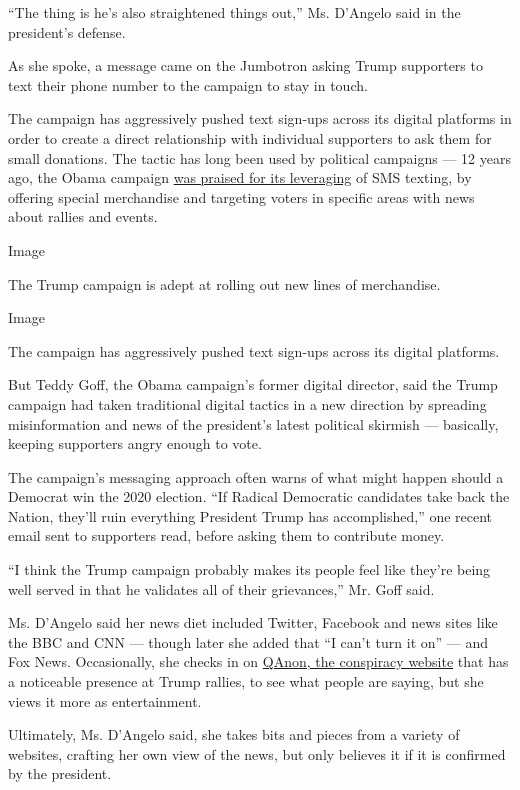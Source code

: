 ``The thing is he's also straightened things out,'' Ms. D'Angelo said in
the president's defense.

As she spoke, a message came on the Jumbotron asking Trump supporters to
text their phone number to the campaign to stay in touch.

The campaign has aggressively pushed text sign-ups across its digital
platforms in order to create a direct relationship with individual
supporters to ask them for small donations. The tactic has long been
used by political campaigns --- 12 years ago, the Obama campaign
\href{https://adage.com/article/btob/lessons-sms-marketing-obama-campaign/273955}{was
praised for its leveraging} of SMS texting, by offering special
merchandise and targeting voters in specific areas with news about
rallies and events.

Image

The Trump campaign is adept at rolling out new lines of merchandise.

Image

The campaign has aggressively pushed text sign-ups across its digital
platforms.

But Teddy Goff, the Obama campaign's former digital director, said the
Trump campaign had taken traditional digital tactics in a new direction
by spreading misinformation and news of the president's latest political
skirmish --- basically, keeping supporters angry enough to vote.

The campaign's messaging approach often warns of what might happen
should a Democrat win the 2020 election. ``If Radical Democratic
candidates take back the Nation, they'll ruin everything President Trump
has accomplished,'' one recent email sent to supporters read, before
asking them to contribute money.

``I think the Trump campaign probably makes its people feel like they're
being well served in that he validates all of their grievances,'' Mr.
Goff said.

Ms. D'Angelo said her news diet included Twitter, Facebook and news
sites like the BBC and CNN --- though later she added that ``I can't
turn it on'' --- and Fox News. Occasionally, she checks in on
\href{https://www.nytimes.com/2020/02/09/us/politics/qanon-trump-conspiracy-theory.html}{QAnon,
the conspiracy website} that has a noticeable presence at Trump rallies,
to see what people are saying, but she views it more as entertainment.

Ultimately, Ms. D'Angelo said, she takes bits and pieces from a variety
of websites, crafting her own view of the news, but only believes it if
it is confirmed by the president.


